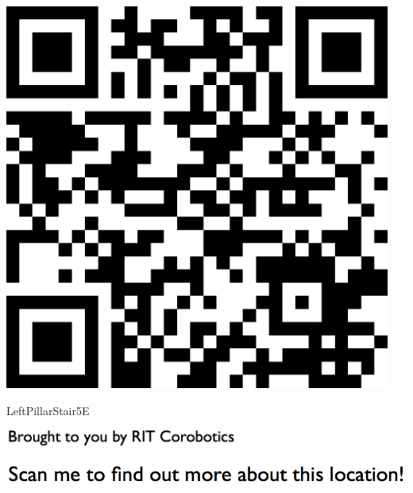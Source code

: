 \documentclass[letterpaper]{article}
\begin{document}
 \begingroup 
 \centerline{\includegraphics[scale=1,width=5in,height=5in]{LeftPillarStair5E.png}} 
 \endgroup 
 \vspace*{\fill} 

 \hfill{\small LeftPillarStair5E} 

  \vspace{0.7in} 
 
 \centerline{\includegraphics[scale=1,width=3in]{text-bottom.png}} 
 
 \pagebreak 
{} 
 \vspace*{\fill} 
 
  \centerline{\includegraphics[scale=1,width=6in]{text-top.png}} 
 
 \vspace{0.5in} 
 
\end{document}
